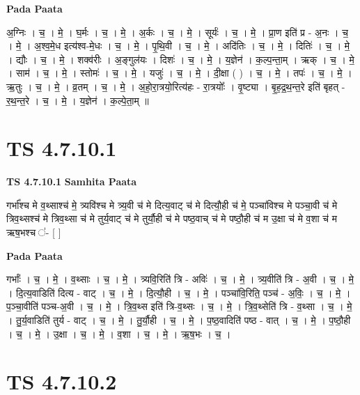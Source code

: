\documentclass[17pt]{extarticle}
\begin{document}
\textbf{Pada Paata} \newline

अ॒ग्निः । च॒ । मे॒ । घ॒र्मः । च॒ । मे॒ । अ॒र्कः । च॒ । मे॒ । सूर्यः॑ । च॒ । मे॒ । प्रा॒ण इति॑ प्र - अ॒नः । च॒ । मे॒ । अ॒श्व॒मे॒ध इत्य॑श्व-मे॒धः । च॒ । मे॒ । पृ॒थि॒वी । च॒ । मे॒ । अदि॑तिः । च॒ । मे॒ । दितिः॑ । च॒ । मे॒ । द्यौः । च॒ । मे॒ । शक्व॑रीः । अ॒ङ्गुल॑यः । दिशः॑ । च॒ । मे॒ । य॒ज्ञेन॑ । क॒ल्प॒न्ता॒म् । ऋक् । च॒ । मे॒ । साम॑ । च॒ । मे॒ । स्तोमः॑ । च॒ । मे॒ । यजुः॑ । च॒ । मे॒ । दी॒क्षा ( ) । च॒ । मे॒ । तपः॑ । च॒ । मे॒ । ऋ॒तुः । च॒ । मे॒ । व्र॒तम् । च॒ । मे॒ । अ॒हो॒रा॒त्रयो॒रित्य॑हः - रा॒त्रयोः᳚ । वृ॒ष्ट्या । बृ॒ह॒द्र॒थ॒न्त॒रे इति॑ बृहत् - र॒थ॒न्त॒रे । च॒ । मे॒ । य॒ज्ञेन॑ । क॒ल्पे॒ता॒म् ॥  \newline





\section{ TS 4.7.10.1 }

\textbf{TS 4.7.10.1 } \newline
\textbf{Samhita Paata} \newline

गर्भा᳚श्च मे व॒थ्साश्च॑ मे॒ त्र्यवि॑श्च मे त्र्य॒वी च॑ मे दित्य॒वाट् च॑ मे दित्यौ॒ही च॑ मे॒ पञ्चा॑विश्च मे पञ्चा॒वी च॑ मे त्रिव॒थ्सश्च॑ मे त्रिव॒थ्सा च॑ मे तुर्य॒वाट् च॑ मे तुर्यौ॒ही च॑ मे पष्ठ॒वाच् च॑ मे पष्ठौ॒ही च॑ म उ॒क्षा च॑ मे व॒शा च॑ म ऋष॒भश्च ॑- [  ] \newline

\textbf{Pada Paata} \newline

गर्भाः᳚ । च॒ । मे॒ । व॒थ्साः । च॒ । मे॒ । त्र्यवि॒रिति॑ त्रि - अविः॑ । च॒ । मे॒ । त्र्य॒वीति॑ त्रि - अ॒वी । च॒ । मे॒ । दि॒त्य॒वाडिति॑ दित्य - वाट् । च॒ । मे॒ । दि॒त्यौ॒ही । च॒ । मे॒ । पञ्चा॑वि॒रिति॒ पञ्च॑ - अ॒विः॒ । च॒ । मे॒ । प॒ञ्चा॒वीति॑ पञ्च-अ॒वी । च॒ । मे॒ । त्रि॒व॒थ्स इति॑ त्रि-व॒थ्सः । च॒ । मे॒ । त्रि॒व॒थ्सेति॑ त्रि - व॒थ्सा । च॒ । मे॒ । तु॒र्य॒वाडिति॑ तुर्य - वाट् । च॒ । मे॒ । तु॒र्यौ॒ही । च॒ । मे॒ । प॒ष्ठ॒वादिति॑ पष्ठ - वात् । च॒ । मे॒ । प॒ष्ठौ॒ही । च॒ । मे॒ । उ॒क्षा । च॒ । मे॒ । व॒शा । च॒ । मे॒ । ऋ॒ष॒भः । च॒ ।  \newline





\section{ TS 4.7.10.2 }
\end{document}
